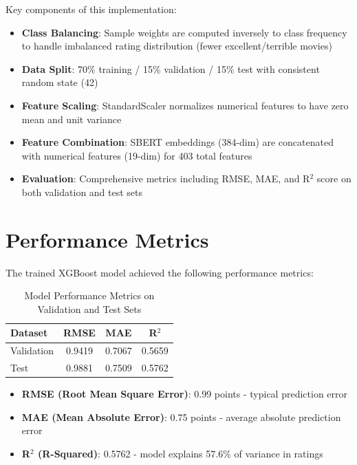 

Key components of this implementation:

\begin{itemize}
    \item \textbf{Class Balancing}: Sample weights are computed inversely to class frequency to handle imbalanced rating distribution (fewer excellent/terrible movies)
    \item \textbf{Data Split}: 70\% training / 15\% validation / 15\% test with consistent random state (42)
    \item \textbf{Feature Scaling}: StandardScaler normalizes numerical features to have zero mean and unit variance
    \item \textbf{Feature Combination}: SBERT embeddings (384-dim) are concatenated with numerical features (19-dim) for 403 total features
    \item \textbf{Evaluation}: Comprehensive metrics including RMSE, MAE, and R$^2$ score on both validation and test sets
\end{itemize}

\section{Performance Metrics}

The trained XGBoost model achieved the following performance metrics:

\clearpage
\begin{table}[h]
\centering
\begin{tabular}{lccc}
\toprule
\textbf{Dataset} & \textbf{RMSE} & \textbf{MAE} & \textbf{R$^2$} \\
\midrule
Validation & 0.9419 & 0.7067 & 0.5659 \\
Test & 0.9881 & 0.7509 & 0.5762 \\
\bottomrule
\end{tabular}
\caption{Model Performance Metrics on Validation and Test Sets}
\label{tab:performance}
\end{table}

\begin{itemize}
    \item \textbf{RMSE (Root Mean Square Error)}: 0.99 points - typical prediction error
    \item \textbf{MAE (Mean Absolute Error)}: 0.75 points - average absolute prediction error
    \item \textbf{R$^2$ (R-Squared)}: 0.5762 - model explains 57.6\% of variance in ratings
\end{itemize}

